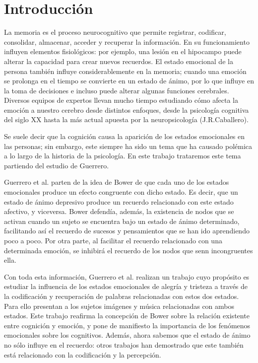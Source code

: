 \documentclass[a4paper,11pt]{article}
\begin{document}
\section{Introducción}
La memoria es el proceso neurocognitivo que permite registrar, codificar, consolidar, almacenar, acceder y recuperar la información. En su funcionamiento influyen elementos fisiológicos: por ejemplo, una lesión en el hipocampo puede alterar la capacidad para crear nuevos recuerdos. El estado emocional de la persona también influye considerablemente en la memoria; cuando una emoción se prolonga en el tiempo se convierte en un estado de ánimo, por lo que influye en la toma de decisiones e incluso puede alterar algunas funciones cerebrales. Diversos equipos de expertos llevan mucho tiempo estudiando cómo afecta la emoción a nuestro cerebro desde distintos enfoques, desde la psicología cognitiva del siglo XX hasta la más actual apuesta por la neuropsicología (J.R.Caballero).

Se suele decir que la cognición causa la aparición de los estados emocionales en las personas; sin embargo, este siempre ha sido un tema que ha causado polémica a lo largo de la historia de la psicología. En este trabajo trataremos este tema partiendo del estudio de Guerrero.

Guerrero et al. parten de la idea de Bower de que cada uno de los estados emocionales produce un efecto congruente con dicho estado. Es decir, que un estado de ánimo depresivo produce un recuerdo relacionado con este estado afectivo, y viceversa. Bower defendía, además, la existencia de nodos que se activan cuando un sujeto se encuentra bajo un estado de ánimo determinado, facilitando así el recuerdo de sucesos y pensamientos que se han ido aprendiendo poco a poco. Por otra parte, al facilitar el recuerdo relacionado con una determinada emoción, se inhibirá el recuerdo de los nodos que senn incongruentes ella. 

Con toda esta información, Guerrero et al. realizan un trabajo cuyo propósito es estudiar la influencia de los estados emocionales de alegría y tristeza a través de la codificación y recuperación de palabras relacionadas con estos dos estados. Para ello presentan a los sujetos imágenes y música relacionadas con ambos estados. Este trabajo reafirma la concepción de Bower sobre la relación existente entre cognición y emoción, y pone de manifiesto la importancia de los fenómenos emocionales sobre los cognitivos. Además, ahora sabemos que el estado de ánimo no sólo influye en el recuerdo: otros trabajos han demostrado que este también está relacionado con la codificación y la percepción.
\end{document}
